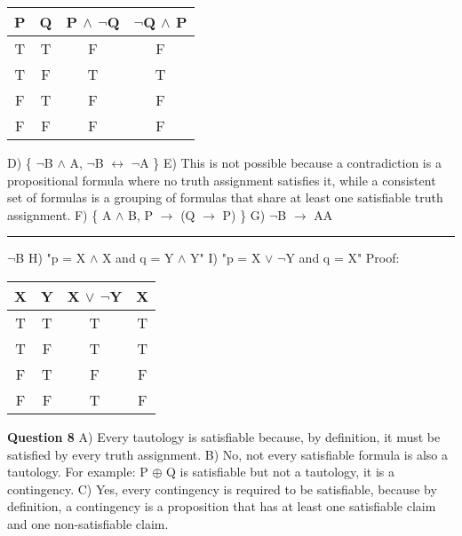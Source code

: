 \documentclass{article}
\begin{document}
\begin{center}
\begin{tabular}{ |c|c|c|c| }
\hline
P & Q & P $\wedge$ $\neg$Q & $\neg$Q $\wedge$ P \\
\hline
T & T & F & F\\
T & F & T & T\\
F & T & F & F\\
F & F & F & F\\
\hline
\end{tabular}
\end{center}

D) \{ $\neg$B $\wedge$ A, $\neg$B $\leftrightarrow$ $\neg$A \} \newline
E) This is not possible because a contradiction is a propositional formula where no truth assignment satisfies it, while a consistent set of formulas is a grouping of formulas that share at least one satisfiable truth assignment.\newline
F) \{ A $\wedge$ B, P $\rightarrow$ (Q $\rightarrow$ P) \} \newline
G) \newline $\neg$B $\rightarrow$ A\newline A \newline \rule{40pt}{2pt} \newline $\neg$B \newline
H) "p = X $\wedge$ X and q = Y $\wedge$ Y" \newline
I) "p = X $\lor$ $\neg$Y and q = X"\newline
Proof:\newline
\begin{center}
\begin{tabular}{ |c|c||c|c| }
\hline
X & Y & X $\lor$ $\neg$Y & X\\
\hline
T & T & T & T\\
T & F & T & T\\
F & T & F & F\\
F & F & T & F\\
\hline
\end{tabular}
\end{center}

\textbf{Question 8}\newline
A) Every tautology is satisfiable because, by definition, it must be satisfied by every truth assignment. \newline
B) No, not every satisfiable formula is also a tautology. For example: P $\oplus$ Q is satisfiable but not a tautology, it is a contingency.\newline
C) Yes, every contingency is required to be satisfiable, because by definition, a contingency is a proposition that has at least one satisfiable claim and one non-satisfiable claim. \newline
\end{document}

